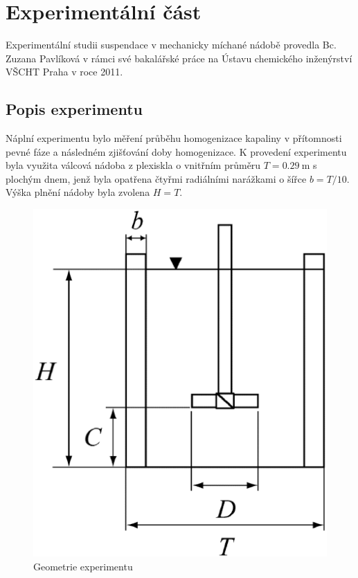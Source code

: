 \chapter{Experimentální část}
Experimentální studii suspendace v mechanicky míchané nádobě provedla Bc.\,Zuzana Pavlíková v rámci své bakalářské práce na Ústavu chemického inženýrství VŠCHT Praha v roce 2011.

\section{Popis experimentu}
Náplní experimentu bylo měření průběhu homogenizace kapaliny v přítomnosti pevné fáze a následném zjišťování doby homogenizace. K provedení experimentu byla využita válcová nádoba z plexiskla o vnitřním průměru $T=\SI{0.29}{\meter}$ s plochým dnem, jenž byla opatřena čtyřmi radiálními narážkami o šířce $b=T/10$. Výška plnění nádoby byla zvolena $H=T$. 

\begin{figure}[h!]
\begin{center}
\includegraphics[scale=0.45]{images/mujedit.eps}
\caption{Geometrie experimentu}
\label{fig:nadoba}
\end{center}
\end{figure} 

